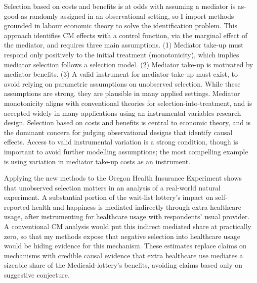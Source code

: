 Selection based on costs and benefits is at odds with assuming a mediator is as-good-as randomly assigned in an observational setting, so I import methods grounded in labour economic theory to solve the identification problem.
This approach identifies CM effects with a control function, via the marginal effect of the mediator, and requires three main assumptions.
(1) Mediator take-up must respond only positively to the initial treatment (monotonicity), which implies mediator selection follows a selection model.
(2) Mediator take-up is motivated by mediator benefits.
(3) A valid instrument for mediator take-up must exist, to avoid relying on parametric assumptions on unobserved selection.
While these assumptions are strong, they are plausible in many applied settings.
Mediator monotonicity aligns with conventional theories for selection-into-treatment, and is accepted widely in many applications using an instrumental variables research design.
Selection based on costs and benefits is central to economic theory, and is the dominant concern for judging observational designs that identify causal effects.
Access to valid instrumental variation is a strong condition, though is important to avoid further modelling assumptions; the most compelling example is using variation in mediator take-up costs as an instrument.

Applying the new methods to the Oregon Health Insurance Experiment shows that unobserved selection matters in an analysis of a real-world natural experiment.
A substantial portion of the wait-list lottery's impact on self-reported health and happiness is mediated indirectly through extra healthcare usage, after instrumenting for healthcare usage with respondents' usual provider.
A conventional CM analysis would put this indirect mediated share at practically zero, so that my methods expose that negative selection into healthcare usage would be hiding evidence for this mechanism.
These estimates replace claims on mechanisms with credible causal evidence that extra healthcare use mediates a sizeable share of the Medicaid-lottery's benefits, avoiding claims based only on suggestive conjecture.


